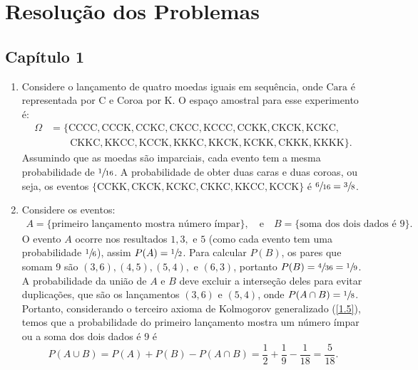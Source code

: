 \chapter*{Resolução dos Problemas}

\section*{Capítulo 1}

\begin{enumerate}[label=\textbf{1.\arabic*.}]
\item \label{r1.1} Considere o lançamento de quatro moedas iguais em sequência, onde $\text{Cara}$ é representada por $\text{C}$ e $\text{Coroa}$ por $\text{K}$. O espaço amostral para esse experimento é:
\begin{align*}
	\Omega &= \{\text{CCCC}, \text{CCCK}, \text{CCKC}, \text{CKCC}, \text{KCCC}, \text{CCKK}, \text{CKCK}, \text{KCKC}, \\ 
	&\qquad\text{CKKC}, \text{KKCC}, \text{KCCK}, \text{KKKC}, \text{KKCK}, \text{KCKK}, \text{CKKK}, \text{KKKK}\}.
\end{align*}
Assumindo que as moedas são imparciais, cada evento tem a mesma probabilidade de $\sfrac{1}{16}$. A probabilidade de obter duas caras e duas coroas, ou seja, os eventos $\{ \text{CCKK}, \text{CKCK}, \text{KCKC}, \text{CKKC}, \text{KKCC}, \text{KCCK}\}$ é $\sfrac{6}{16} = \sfrac{3}{8}$.

\item Considere os eventos:
\begin{align*}
	A = \{ \text{primeiro lançamento mostra número ímpar} \}, \quad \text{e} \quad
	B = \{ \text{soma dos dois dados é 9} \}.
\end{align*}
O evento $A$ ocorre nos resultados $1, 3,$ e $5$ (como cada evento tem uma probabilidade $\sfrac{1}{6}$), assim $P(A) = \sfrac{1}{2}$. Para calcular $P(B)$, os pares que somam 9 são $(3,6), (4,5), (5,4),$ e $(6,3)$, portanto $P(B) = \sfrac{4}{36} = \sfrac{1}{9}$. A probabilidade da união de $A$ e $B$ deve excluir a interseção deles para evitar duplicações, que são os lançamentos $(3,6)$ e $(5,4)$, onde $P(A \cap B) = \sfrac{1}{8}$. Portanto, considerando o terceiro axioma de Kolmogorov generalizado (\autoref{1.5}), temos que a probabilidade do primeiro lançamento mostra um número ímpar ou a soma dos dois dados é 9 é
\begin{equation*}
P(A \cup B) = P(A) + P(B) - P(A \cap B) = \dfrac{1}{2} + \dfrac{1}{9} - \dfrac{1}{18} = \dfrac{5}{18}.
\end{equation*}


\end{enumerate}
